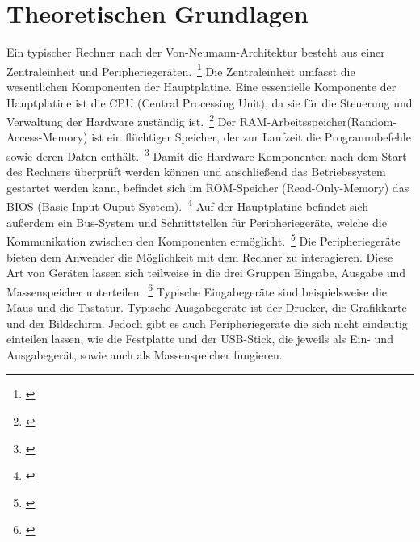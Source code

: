 \section{Theoretischen Grundlagen}
\label{sec:Theorie}
Ein typischer Rechner nach der Von-Neumann-Architektur besteht aus einer Zentraleinheit und Peripheriegeräten.~\footnote{\cite[S.~92]{Herold.2012}} Die Zentraleinheit umfasst die wesentlichen Komponenten der Hauptplatine. Eine essentielle Komponente der Hauptplatine ist die CPU (Central Processing Unit), da sie für die Steuerung und Verwaltung der Hardware zuständig ist.~\footnote{\cite[S.~95]{Herold.2012}} Der RAM-Arbeitsspeicher(Random-Access-Memory) ist ein flüchtiger Speicher, der zur Laufzeit die Programmbefehle sowie deren Daten enthält.~\footnote{\cite[S.~96]{Herold.2012}} Damit die Hardware-Komponenten nach dem Start des Rechners überprüft werden können und anschließend das Betriebssystem gestartet werden kann, befindet sich im ROM-Speicher (Read-Only-Memory) das BIOS (Basic-Input-Ouput-System).~\footnote{\cite[S.~96]{Herold.2012}} Auf der Hauptplatine befindet sich außerdem ein Bus-System und Schnittstellen für Peripheriegeräte, welche die Kommunikation zwischen den Komponenten ermöglicht.~\footnote{\cite[S.~96]{Herold.2012}}
Die Peripheriegeräte bieten dem Anwender die Möglichkeit mit dem Rechner zu interagieren. Diese Art von Geräten lassen sich teilweise in die drei Gruppen Eingabe, Ausgabe und Massenspeicher unterteilen.~\footnote{\cite[S.~118]{Herold.2012}} Typische Eingabegeräte sind beispielsweise die Maus und die Tastatur. Typische Ausgabegeräte ist der Drucker, die Grafikkarte und der Bildschirm. Jedoch gibt es auch Peripheriegeräte die sich nicht eindeutig einteilen lassen, wie die Festplatte und der USB-Stick, die jeweils als Ein- und Ausgabegerät, sowie auch als Massenspeicher fungieren.
